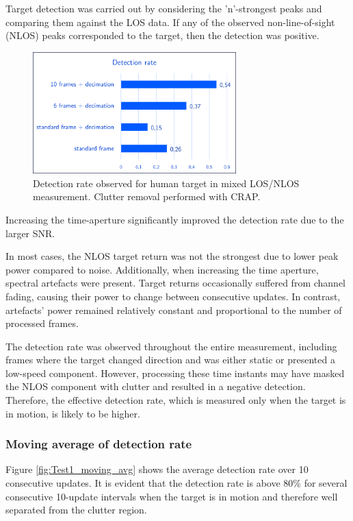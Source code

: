 Target detection was carried out by considering the 'n'-strongest peaks and comparing them against the LOS data. If any of the observed non-line-of-sight (NLOS) peaks corresponded to the target, then the detection was positive.

\begin{figure}[H]
	\centering
	\includegraphics[width=0.7\textwidth]{Images/Test1/detect_hist/detect_hist_human_LMsans.png}
	\caption{Detection rate observed for human target in mixed LOS/NLOS measurement. Clutter removal performed with CRAP.}
	\label{fig:Test1_detect_hist}
\end{figure}

Increasing the time-aperture significantly improved the detection rate due to the larger SNR.

In most cases, the NLOS target return was not the strongest due to lower peak power compared to noise. Additionally, when increasing the time aperture, spectral artefacts were present.
Target returns occasionally suffered from channel fading, causing their power to change between consecutive updates. In contrast, artefacts' power remained relatively constant and proportional to the number of processed frames.

The detection rate was observed throughout the entire measurement, including frames where the target changed direction and was either static or presented a low-speed component. However, processing these time instants may have masked the NLOS component with clutter and resulted in a negative detection. Therefore, the effective detection rate, which is measured only when the target is in motion, is likely to be higher.


\subsubsection{Moving average of detection rate}

Figure \ref{fig:Test1_moving_avg} shows the average detection rate over 10 consecutive updates. It is evident that the detection rate is above 80\% for several consecutive 10-update intervals when the target is in motion and therefore well separated from the clutter region.


